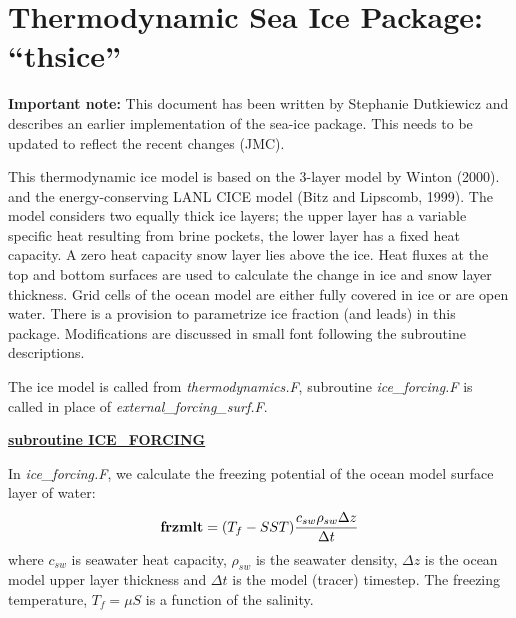 


% 


\def\deg{$^o$}
\section{Thermodynamic Sea Ice Package: ``thsice''}

{\bf Important note:}
This document has been written by Stephanie Dutkiewicz
and describes an earlier implementation of the sea-ice package.
This needs to be updated to reflect the recent changes (JMC).

\noindent
This thermodynamic ice model is based on the 3-layer model by Winton (2000).
and the energy-conserving LANL CICE model (Bitz and Lipscomb, 1999).
The model considers two equally thick ice layers; the upper layer has
a variable specific heat resulting from brine pockets,
the lower layer has a fixed heat capacity. A zero heat capacity snow
layer lies above the ice. Heat fluxes at the top and bottom
surfaces are used to calculate the change in ice and snow layer
thickness. Grid cells of the ocean model are 
either fully covered in ice or are open water. There is
a provision to parametrize ice fraction (and leads) in this package.
Modifications are discussed in small font following the
subroutine descriptions.


\vspace{1cm}

\noindent
The ice model is called from {\it thermodynamics.F}, subroutine
{\it ice\_forcing.F} is called in place of {\it external\_forcing\_surf.F}.


\vspace{1cm}
\noindent
{\bf \underline{subroutine ICE\_FORCING}}

\noindent
In {\it ice\_forcing.F}, we calculate the freezing potential of the
ocean model surface layer of water:
\[
  {\bf frzmlt} = (T_f - SST) \frac{c_{sw} \rho_{sw} \Delta z}{\Delta t}
\]
where $c_{sw}$ is seawater heat capacity, 
$\rho_{sw}$ is the seawater density, $\Delta z$
is the ocean model upper layer thickness and $\Delta t$ is the model (tracer)
timestep. The freezing temperature, $T_f=\mu S$ is a function of the
salinity.


